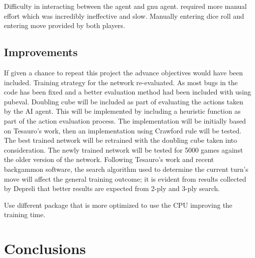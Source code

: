 \documentclass[12pt,a4paper]{article}
\begin{document}
Difficulty in interacting between the agent and gnu agent. required more manual effort which was incredibly ineffective and slow. Manually entering dice roll and entering move provided by both players.

\subsection{Improvements}
If given a chance to repeat this project the advance objectives would have been included. Training strategy for the network re-evaluated. As most bugs in the code has been fixed and a better evaluation method had been included with using pubeval. Doubling cube will be included as part of evaluating the actions taken by the AI agent. This will be implemented by including a heuristic function as part of the action evaluation process. The implementation will be initially based on Tesauro's \citeyear{DBLP:journals/ai/Tesauro02} work, then an implementation using Crawford rule will be tested. The best trained network will be retrained with the doubling cube taken into consideration. The newly trained network will be tested for 5000 games against the older version of the network. 
Following Tesauro's \citeyear{DBLP:journals/ai/Tesauro02} work and recent backgammon software, the search algorithm used to determine the current turn's move will affect the general training outcome; it is evident from results collected by Depreli \citeyear{botbattle} that better results are expected from 2-ply and 3-ply search. 

Use different package that is more optimized to use the CPU improving the training time.

\section{Conclusions}


\end{document}
